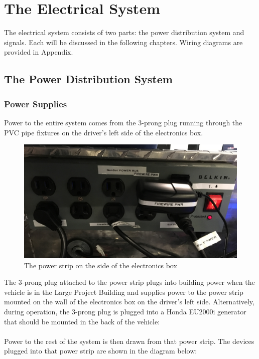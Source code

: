 \chapter{The Electrical System}

The electrical system consists of two parts: the power distribution system and signals. Each will be discussed in the following chapters. Wiring diagrams are provided in Appendix.

\section{The Power Distribution System}

\subsection{Power Supplies}
Power to the entire system comes from the 3-prong plug running through the PVC pipe fixtures on the driver's left side of the electronics box.

\begin{figure}[h!]
\centering
\includegraphics[scale=.1]{Photos/PowerStrip.jpg}
\caption{The power strip on the side of the electronics box}
\label{fig:powerstrip}
\end{figure} 

 \noindent The 3-prong plug attached to the power strip plugs into building power when the vehicle is in the Large Project Building and supplies power to the power strip mounted on the wall of the electronics box on the driver's left side. Alternatively, during operation, the 3-prong plug is plugged into a Honda EU2000i generator that should be mounted in the back of the vehicle:\\ \\
%
 Power to the rest of the system is then drawn from that power strip. The devices plugged into that power strip are shown in the diagram below:\\ \\

